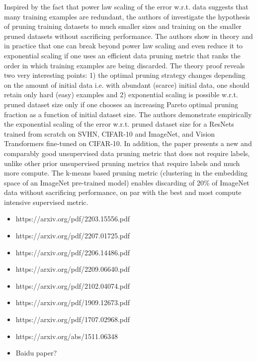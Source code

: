 \documentclass{article} %
\begin{document}
Inspired by the fact that power law scaling of the error w.r.t. data suggests that many training examples are redundant, the authors of \cite{sorscher2023neural} investigate the hypothesis of pruning training datasets to much smaller sizes and training on the smaller pruned datasets without sacrificing performance. The authors show in theory and in practice that one can break beyond power law scaling and even reduce it to exponential scaling if one uses an efficient data pruning metric that ranks the order in which training examples are being discarded. The theory proof reveals two very interesting points: 1) the optimal pruning strategy changes depending on the amount of initial data i.e. with abundant (scarce) initial data, one should retain only hard (easy) examples and 2) exponential scaling is possible w.r.t. pruned dataset size only if one chooses an increasing Pareto optimal pruning fraction as a function of initial dataset size. The authors demonstrate empirically the exponential scaling of the error w.r.t. pruned dataset size for a ResNets trained from scratch on SVHN, CIFAR-10 and ImageNet, and Vision Transformers fine-tuned on CIFAR-10. In addition, the paper presents a new and comparably good unsupervised data pruning metric that does not require labels, unlike other prior unsupervised pruning metrics that require labels and much more compute. The k-means based pruning metric (clustering in the embedding space of an ImageNet pre-trained model) enables discarding of 20\% of ImageNet data without sacrificing performance, on par with the best and most compute intensive supervised metric.

\cite{hoffmann2022training}
\cite{alabdulmohsin2022revisiting}
\cite{hutter2021learning}
\cite{mahmood2022data}
\cite{rosenfeld2019constructive}
\cite{sorscher2023neural}
\cite{sun2017revisiting}
\cite{cho2016data}

\begin{itemize}
    \item https://arxiv.org/pdf/2203.15556.pdf
    \item https://arxiv.org/pdf/2207.01725.pdf
    \item https://arxiv.org/pdf/2206.14486.pdf
    \item https://arxiv.org/pdf/2209.06640.pdf
    \item https://arxiv.org/pdf/2102.04074.pdf
    \item https://arxiv.org/pdf/1909.12673.pdf
    \item https://arxiv.org/pdf/1707.02968.pdf
    \item https://arxiv.org/abs/1511.06348
    \item Baidu paper?
\end{itemize}
\end{document}
